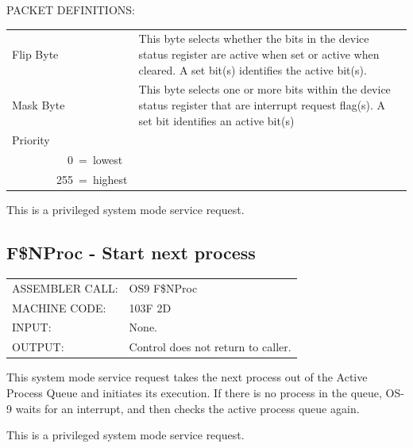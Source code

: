 \documentclass[
]{article}
\newcounter{none} %
\begin{document}
PACKET DEFINITIONS:

{\def\LTcaptype{none} %
\begin{longtable}[]{@{}
  >{\raggedright\arraybackslash}p{}
  >{\raggedright\arraybackslash}p{}@{}}
\toprule\noalign{}
\endhead
\bottomrule\noalign{}
\endlastfoot
Flip Byte & This byte selects whether the bits in the device status
register are active when set or active when cleared. A set bit(s)
identifies the active bit(s). \\
Mask Byte & This byte selects one or more bits within the device status
register that are interrupt request flag(s). A set bit identifies an
active bit(s) \\
Priority & \begin{minipage}[t]{\linewidth}\raggedright
The~device~priority~number:\\
\strut ~~~~~~~~~~0~=~lowest\\
\strut ~~~~~~~~255~=~highest
\end{minipage} \\
\end{longtable}
}

This is a privileged system mode service request.

\subsection{F\$NProc - Start next process}

{\def\LTcaptype{none} %
\begin{longtable}[]{@{}
  >{\raggedright\arraybackslash}p{}
  >{\raggedright\arraybackslash}p{}@{}}
\toprule\noalign{}
\endhead
\bottomrule\noalign{}
\endlastfoot
ASSEMBLER CALL: & OS9 F\$NProc \\
MACHINE CODE: & 103F 2D \\
INPUT: & None. \\
OUTPUT: & Control does not return to caller. \\
\end{longtable}
}

This system mode service request takes the next process out of the
Active Process Queue and initiates its execution. If there is no process
in the queue, OS-9 waits for an interrupt, and then checks the active
process queue again.

This is a privileged system mode service request.
\end{document}
